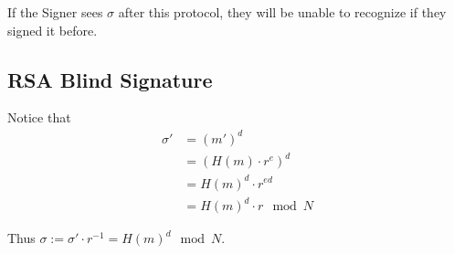 If the Signer sees $\sigma$ after this protocol, they will be unable to recognize if they signed it before.

\subsection{RSA Blind Signature}


Notice that 
\begin{align*}
    \sigma' &= (m')^d\\
    &= (H(m)\cdot r^e)^d\\
    &= H(m)^d \cdot r^{ed}\\
    &= H(m)^d \cdot r \mod N
\end{align*}

Thus $\sigma := \sigma' \cdot r^{-1} = H(m)^d \mod N$.